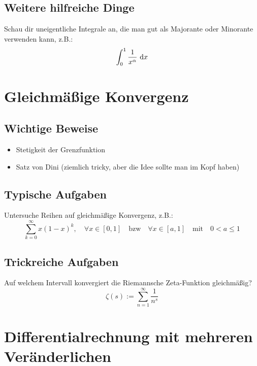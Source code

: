 \subsection{Weitere hilfreiche Dinge}
Schau dir uneigentliche Integrale an, die man gut als Majorante oder Minorante
verwenden kann, z.B.:
\begin{equation*}
    \int_0^1 \frac{1}{x^\alpha}\text{ d}x
\end{equation*}

\section{Gleichmäßige Konvergenz}
\subsection{Wichtige Beweise}
\begin{itemize}
  \item Stetigkeit der Grenzfunktion
  \item Satz von Dini (ziemlich tricky, aber die Idee sollte man im Kopf haben)
\end{itemize}

\subsection{Typische Aufgaben}
Untersuche Reihen auf gleichmäßige Konvergenz, z.B.:
\begin{equation*}
    \sum_{k=0}^\infty x{(1-x)}^k,\quad \forall x \in [0,1] \quad \text{bzw} \quad \forall x \in [a,1] \quad \text{mit} \quad 0 < a \leq 1
\end{equation*}

\subsection{Trickreiche Aufgaben}
Auf welchem Intervall konvergiert die Riemannsche Zeta-Funktion gleichmäßig?
\begin{equation*}
    \zeta(s):=\sum_{n=1}^\infty \frac{1}{n^s}
\end{equation*}

\section{Differentialrechnung mit mehreren Veränderlichen}
